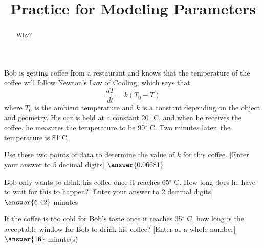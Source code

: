 \documentclass{ximera}
\title{Practice for Modeling Parameters}
\begin{document}
\begin{abstract}
    Why?
\end{abstract}
\maketitle


\begin{exercise}
    Bob is getting coffee from a restaurant and knows that the temperature of the coffee will follow Newton's Law of Cooling, which says that
    \begin{equation*}
        \frac{dT}{dt} = k(T_0 - T)
    \end{equation*}
    where $T_0$ is the ambient temperature and $k$ is a constant depending on the object and geometry. His car is held at a constant 20$^\circ$ C, and when he receives the coffee, he measures the temperature to be 90$^\circ$ C. Two minutes later, the temperature is 81$^\circ$C.
    
    Use these two points of data to determine the value of $k$ for this coffee. [Enter your answer to 5 decimal digits] $\answer{0.06681}$
    
    \begin{problem}
        Bob only wants to drink his coffee once it reaches 65$^\circ$ C. How long does he have to wait for this to happen? [Enter your answer to 2 decimal digits] $\answer{6.42}$ minutes
        \begin{problem}
            If the coffee is too cold for Bob's taste once it reaches 35$^\circ$ C, how long is the acceptable window for Bob to drink his coffee? [Enter as a whole number] $\answer{16}$ minute(s)
        \end{problem}
    \end{problem} 
\end{exercise}
\end{document}
